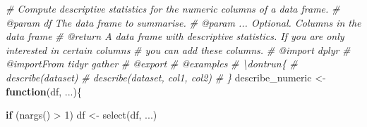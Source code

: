 \documentclass[
]{article}
\newenvironment{Shaded}{\begin{snugshade}}{\end{snugshade}}
\newcommand{\CommentTok}[1]{\textcolor[rgb]{0.56,0.35,0.01}{\textit{#1}}}
\newcommand{\ControlFlowTok}[1]{\textcolor[rgb]{0.13,0.29,0.53}{\textbf{#1}}}
\newcommand{\DecValTok}[1]{\textcolor[rgb]{0.00,0.00,0.81}{#1}}
\newcommand{\FunctionTok}[1]{\textcolor[rgb]{0.00,0.00,0.00}{#1}}
\newcommand{\NormalTok}[1]{#1}
\newcommand{\OtherTok}[1]{\textcolor[rgb]{0.56,0.35,0.01}{#1}}
\newcommand{\SpecialCharTok}[1]{\textcolor[rgb]{0.00,0.00,0.00}{#1}}
\begin{document}
\begin{Shaded}
\begin{Highlighting}[]
\CommentTok{\#\textquotesingle{} Compute descriptive statistics for the numeric columns of a data frame.}
\CommentTok{\#\textquotesingle{} @param df The data frame to summarise.}
\CommentTok{\#\textquotesingle{} @param ... Optional. Columns in the data frame}
\CommentTok{\#\textquotesingle{} @return A data frame with descriptive statistics. If you are only interested in certain columns}
\CommentTok{\#\textquotesingle{} you can add these columns.}
\CommentTok{\#\textquotesingle{} @import dplyr}
\CommentTok{\#\textquotesingle{} @importFrom tidyr gather}
\CommentTok{\#\textquotesingle{} @export}
\CommentTok{\#\textquotesingle{} @examples}
\CommentTok{\#\textquotesingle{} \textbackslash{}dontrun\{}
\CommentTok{\#\textquotesingle{} describe(dataset)}
\CommentTok{\#\textquotesingle{} describe(dataset, col1, col2)}
\CommentTok{\#\textquotesingle{} \}}
\NormalTok{describe\_numeric }\OtherTok{\textless{}{-}} \ControlFlowTok{function}\NormalTok{(df, ...)\{}

    \ControlFlowTok{if}\NormalTok{ (}\FunctionTok{nargs}\NormalTok{() }\SpecialCharTok{\textgreater{}} \DecValTok{1}\NormalTok{) df }\OtherTok{\textless{}{-}} \FunctionTok{select}\NormalTok{(df, ...)}


\end{Highlighting}
\end{Shaded}
\end{document}
